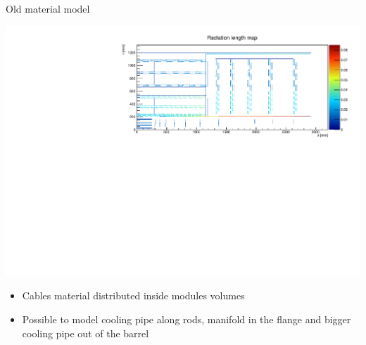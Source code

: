 \documentclass[pdftex, 11pt]{beamer}
\begin{document}
\begin{frame}{Old material model}
  \begin{center}
    \includegraphics[width=\textwidth]{img/oldModel.pdf}
  \end{center}
  \begin{itemize}
  \item Cables material distributed \alert{inside} modules volumes
    \pause
  \item Possible to model \alert{cooling pipe} along rods, \alert{manifold} in the flange and bigger cooling pipe out of the barrel
  \end{itemize}
\end{frame}
\end{document}
